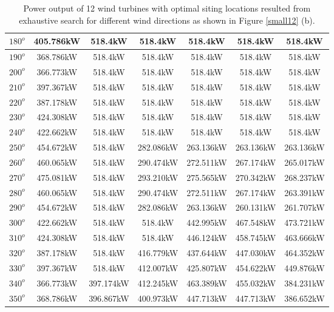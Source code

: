 \begin{table}[H]
\begin{tabular}{|c|c|c|c|c|c|c|}
        		$180^o$	& 405.786kW	& 518.4kW	& 518.4kW	& 518.4kW	& 518.4kW	& 518.4kW	\\ \hline
        		$190^o$	& 368.786kW	& 518.4kW	& 518.4kW	& 518.4kW	& 518.4kW	& 518.4kW	\\ \hline
        		$200^o$	& 366.773kW	& 518.4kW	& 518.4kW	& 518.4kW	& 518.4kW	& 518.4kW	\\ \hline
        		$210^o$	& 397.367kW	& 518.4kW	& 518.4kW	& 518.4kW	& 518.4kW	& 518.4kW	\\ \hline
        		$220^o$	& 387.178kW	& 518.4kW	& 518.4kW	& 518.4kW	& 518.4kW	& 518.4kW	\\ \hline
        		$230^o$	& 424.308kW	& 518.4kW	& 518.4kW	& 518.4kW	& 518.4kW	& 518.4kW	\\ \hline
        		$240^o$	& 422.662kW	& 518.4kW	& 518.4kW	& 518.4kW	& 518.4kW	& 518.4kW	\\ \hline
        		$250^o$	& 454.672kW	& 518.4kW	& 282.086kW	& 263.136kW	& 263.136kW	& 263.136kW	\\ \hline
        		$260^o$	& 460.065kW	& 518.4kW	& 290.474kW	& 272.511kW	& 267.174kW	& 265.017kW	\\ \hline
        		$270^o$	& 475.081kW	& 518.4kW	& 293.210kW	& 275.565kW	& 270.342kW	& 268.237kW	\\ \hline
        		$280^o$	& 460.065kW	& 518.4kW	& 290.474kW	& 272.511kW	& 267.174kW	& 263.391kW	\\ \hline
        		$290^o$	& 454.672kW	& 518.4kW	& 282.086kW	& 263.136kW	& 260.131kW	& 261.707kW	\\ \hline
        		$300^o$	& 422.662kW	& 518.4kW	& 518.4kW	& 442.995kW	& 467.548kW	& 473.721kW	\\ \hline
        		$310^o$	& 424.308kW	& 518.4kW	& 518.4kW	& 446.124kW	& 458.745kW	& 463.666kW	\\ \hline
        		$320^o$	& 387.178kW	& 518.4kW	& 416.779kW	& 437.644kW	& 447.030kW	& 464.352kW	\\ \hline
        		$330^o$	& 397.367kW	& 518.4kW	& 412.007kW	& 425.807kW	& 454.622kW	& 449.876kW	\\ \hline
        		$340^o$	& 366.773kW	& 397.174kW	& 412.245kW	& 463.389kW	& 455.032kW	& 384.231kW	\\ \hline
        		$350^o$	& 368.786kW	& 396.867kW	& 400.973kW	& 447.713kW	& 447.713kW	& 386.652kW	\\ \hline
        	\end{tabular}
        	\caption{Power output of 12 wind turbines with optimal siting locations resulted from exhaustive search for different wind directions as shown in Figure \ref{small12} (b).}
        	\label{table12b}
        \end{table}
        \doublespacing
        

